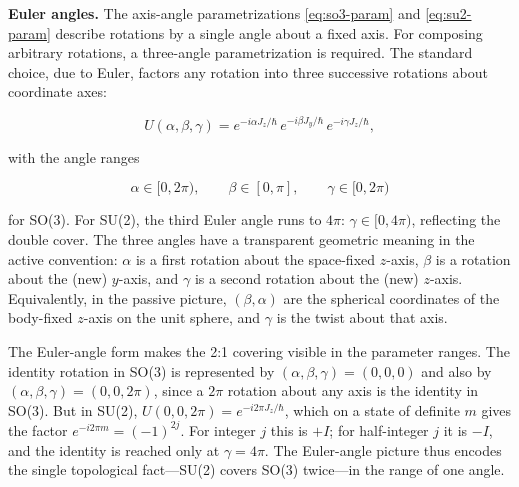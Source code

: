 \medskip\noindent\textbf{Euler angles.} The axis-angle parametrizations \eqref{eq:so3-param} and \eqref{eq:su2-param} describe rotations by a single angle about a fixed axis. For composing arbitrary rotations, a three-angle parametrization is required. The standard choice, due to Euler, factors any rotation into three successive rotations about coordinate axes:
\begin{linenomath}
    \begin{equation}
        U(\alpha,\beta,\gamma) = e^{-i\alpha J_z/\hbar}\,e^{-i\beta J_y/\hbar}\,e^{-i\gamma J_z/\hbar},
        \label{eq:euler-angles}
    \end{equation}
\end{linenomath}
with the angle ranges
\begin{linenomath}
    \begin{equation}
        \alpha \in [0,2\pi),\qquad \beta \in [0,\pi],\qquad \gamma \in [0,2\pi)
    \end{equation}
\end{linenomath}
for SO(3). For SU(2), the third Euler angle runs to $4\pi$: $\gamma \in [0,4\pi)$, reflecting the double cover. The three angles have a transparent geometric meaning in the active convention: $\alpha$ is a first rotation about the space-fixed $z$-axis, $\beta$ is a rotation about the (new) $y$-axis, and $\gamma$ is a second rotation about the (new) $z$-axis. Equivalently, in the passive picture, $(\beta,\alpha)$ are the spherical coordinates of the body-fixed $z$-axis on the unit sphere, and $\gamma$ is the twist about that axis.

The Euler-angle form makes the 2:1 covering visible in the parameter ranges. The identity rotation in SO(3) is represented by $(\alpha,\beta,\gamma)=(0,0,0)$ and also by $(\alpha,\beta,\gamma)=(0,0,2\pi)$, since a $2\pi$ rotation about any axis is the identity in SO(3). But in SU(2), $U(0,0,2\pi)=e^{-i2\pi J_z/\hbar}$, which on a state of definite $m$ gives the factor $e^{-i2\pi m}=(-1)^{2j}$. For integer $j$ this is $+I$; for half-integer $j$ it is $-I$, and the identity is reached only at $\gamma=4\pi$. The Euler-angle picture thus encodes the single topological fact---SU(2) covers SO(3) twice---in the range of one angle.

